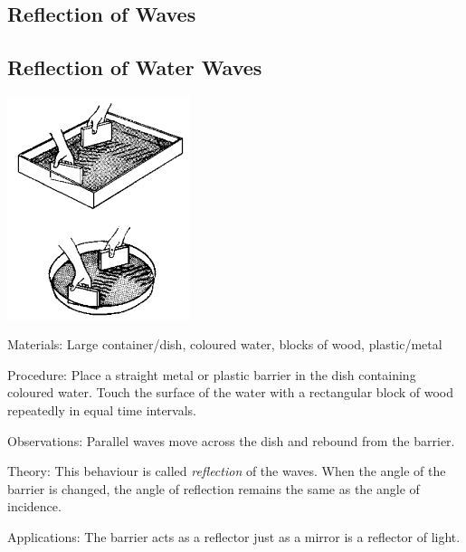 \begin{multicols}{2}

\section*{Reflection of Waves} 


\subsection{Reflection of Water Waves}

\begin{center}
\includegraphics[width=0.4\textwidth]{./img/source/reflection-water-waves.png}
\end{center}

\begin{description*}
\item[Materials:]{Large container/dish, coloured water, blocks of wood, plastic/metal}
\item[Procedure:]{Place a straight metal or plastic barrier in the dish containing coloured water. Touch the surface of the water with a rectangular block of wood repeatedly in equal time intervals.}
\item[Observations:]{Parallel waves move across the dish and rebound from the barrier.}
\item[Theory:]{This behaviour is called \emph{reflection} of the waves. When the angle of the barrier is changed, the angle of reflection remains the same as the angle of incidence.}
\item[Applications:]{The barrier acts as a reflector just as a mirror is a reflector of light.}
\end{description*}


\end{multicols}
